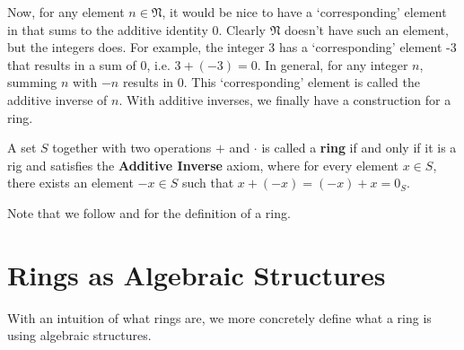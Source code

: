 Now, for any element $n \in \mathfrak{N}$, it would be nice to have a `corresponding' element in that sums to the additive identity 0. Clearly $\mathfrak{N}$ doesn't have such an element, but the integers does. For example, the integer 3 has a `corresponding' element -3 that results in a sum of 0, i.e. $3 + (-3) = 0$. In general, for any integer $n$, summing $n$ with $-n$ results in 0. This `corresponding' element is called the additive inverse of $n$. With additive inverses, we finally have a construction for a ring.

\begin{definition}
    A set $S$ together with two operations $+$ and $\cdot$ is called a \textbf{ring} if and only if it is a rig and satisfies the \textbf{Additive Inverse} axiom, where for every element $x \in S$, there exists an element $-x \in S$ such that $x + (-x) = (-x) + x = 0_S$.
\end{definition}
\begin{remark}
    Note that we follow \cite[p.~223]{dummit_foote_2004} and \cite[p.~115, Definition 1.1]{hungerford_1980} for the definition of a ring.
\end{remark}

\section{Rings as Algebraic Structures}
With an intuition of what rings are, we more concretely define what a ring is using algebraic structures.

